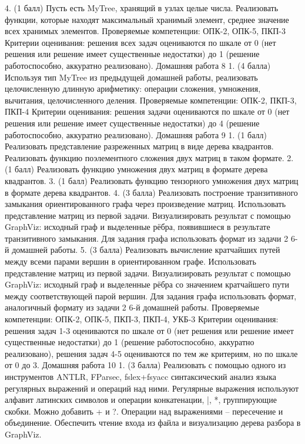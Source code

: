     4. (1 балл) Пусть  есть MyTree, хранящий в узлах целые числа. Реализовать функции, которые находят максимальный хранимый элемент, среднее значение всех хранимых элементов.
Проверяемые компетенции: ОПК-2, ОПК-5, ПКП-3
Критерии оценивания: решения всех задач оцениваются по шкале от 0 (нет решения или решение имеет существенные недостатки) до 1 (решение работоспособно, аккуратно реализовано). 
Домашняя работа 8 
    1. (4 балла) Используя тип MyTree из предыдущей домашней работы, реализовать целочисленную длинную арифметику: операции сложения, умножения, вычитания, целочисленного деления. 
Проверяемые компетенции: ОПК-2, ПКП-3, ПКП-4
Критерии оценивания: решения задачи оцениваются по шкале от 0 (нет решения или решение имеет существенные недостатки) до 4 (решение работоспособно, аккуратно реализовано). 
Домашняя работа 9
    1. (1 балл) Реализовать представление разреженных матриц в виде дерева квадрантов. Реализовать функцию поэлементного сложения двух матриц в таком формате.
    2. (1 балл) Реализовать функцию умножения двух матриц в формате дерева квадрантов.
    3. (1 балл) Реализовать функцию тензорного умножения двух матриц в формате дерева квадрантов.
    4. (3 балла) Реализовать построение транзитивного замыкания ориентированного графа через произведение матриц. Использовать представление матриц из первой задачи. Визуализировать результат с помощью GraphViz: исходный граф и выделенные рёбра, появившиеся в результате транзитивного замыкания. Для задания графа использовать формат из задачи 2 6-й домашней работы.
    5. (3 балла) Реализовать вычисление кратчайших путей между всеми парами вершин в ориентированном графе. Использовать представление матриц из первой задачи. Визуализировать результат с помощью GraphViz: исходный граф и выделенные рёбра со значением кратчайшего пути между соответствующей парой вершин. Для задания графа использовать формат, аналогичный формату из задачи 2 6-й домашней работы.
Проверяемые компетенции: ОПК-2, ОПК-5, ПКП-3, ПКП-4, УКБ-3
Критерии оценивания: решения задач 1-3 оцениваются по шкале от 0 (нет решения или решение имеет существенные недостатки) до 1 (решение работоспособно, аккуратно реализовано), решения задач 4-5 оцениваются по тем же критериям, но по шкале от 0 до 3.
Домашняя работа 10
    1. (3 балла) Реализовать с помощью одного из инструментов ANTLR, FParsec, fslex+fsyacc синтаксический анализ языка регулярных выражений и операций над ними. Регулярные выражения используют алфавит латинских символов и операции конкатенации, |, *, группирующие скобки. Можно добавить + и ?. Операции над выражениями – пересечение и объединение. Обеспечить чтение входа из файла и визуализацию дерева разбора в GraphViz.
